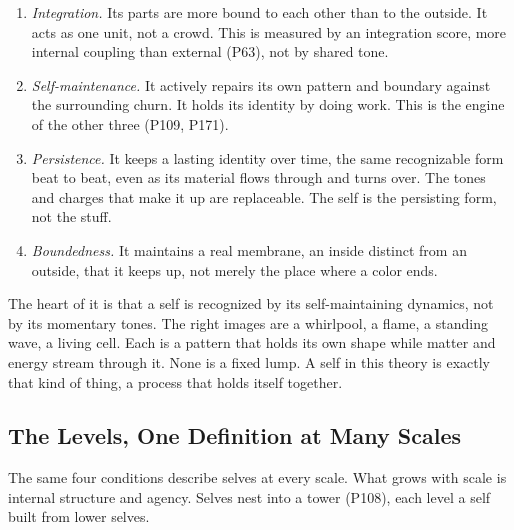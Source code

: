 \begin{enumerate}
\item \emph{Integration.} Its parts are more bound to each other than to the outside. It acts as one unit, not a crowd. This is measured by an integration score, more internal coupling than external (P63), not by shared tone.
\item \emph{Self-maintenance.} It actively repairs its own pattern and boundary against the surrounding churn. It holds its identity by doing work. This is the engine of the other three (P109, P171).
\item \emph{Persistence.} It keeps a lasting identity over time, the same recognizable form beat to beat, even as its material flows through and turns over. The tones and charges that make it up are replaceable. The self is the persisting form, not the stuff.
\item \emph{Boundedness.} It maintains a real membrane, an inside distinct from an outside, that it keeps up, not merely the place where a color ends.
\end{enumerate}

The heart of it is that a self is recognized by its self-maintaining dynamics, not by its momentary tones. The right images are a whirlpool, a flame, a standing wave, a living cell. Each is a pattern that holds its own shape while matter and energy stream through it. None is a fixed lump. A self in this theory is exactly that kind of thing, a process that holds itself together.

\subsection{The Levels, One Definition at Many Scales}

The same four conditions describe selves at every scale. What grows with scale is internal structure and agency. Selves nest into a tower (P108), each level a self built from lower selves.

